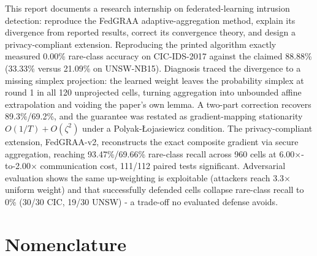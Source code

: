 \documentclass[11pt,a4paper]{report}
\begin{document}
\noindent
This report documents a research internship on federated-learning intrusion
detection: reproduce the FedGRAA adaptive-aggregation method, explain its
divergence from reported results, correct its convergence theory, and design
a privacy-compliant extension. Reproducing the printed algorithm exactly
measured 0.00\% rare-class accuracy on CIC-IDS-2017 against the claimed
88.88\% (33.33\% versus 21.09\% on UNSW-NB15). Diagnosis traced the
divergence to a missing simplex projection: the learned weight leaves the
probability simplex at round 1 in all 120 unprojected cells, turning
aggregation into unbounded affine extrapolation and voiding the paper's own
lemma. A two-part correction recovers 89.3\%/69.2\%, and the guarantee was
restated as gradient-mapping stationarity $O(1/T)+O(\zeta^2)$ under a
Polyak-{\L}ojasiewicz condition. The privacy-compliant extension,
FedGRAA-v2, reconstructs the exact composite gradient via secure
aggregation, reaching 93.47\%/69.66\% rare-class recall across 960 cells at
6.00$\times$-to-2.00$\times$ communication cost, 111/112 paired tests
significant. Adversarial evaluation shows the same up-weighting is
exploitable (attackers reach 3.3$\times$ uniform weight) and that
successfully defended cells collapse rare-class recall to 0\% (30/30 CIC,
19/30 UNSW) - a trade-off no evaluated defense avoids.

{\hypersetup{linkcolor=black}
\tableofcontents
\clearpage
{}
\listoffigures
\clearpage
{}
\listoftables
}

\chapter*{Nomenclature}
\thispagestyle{plain}
\begingroup\footnotesize
\end{document}

